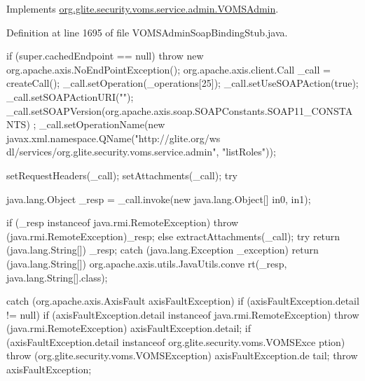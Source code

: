 Implements \hyperlink{interfaceorg_1_1glite_1_1security_1_1voms_1_1service_1_1admin_1_1VOMSAdmin_a546a643a9bbf549ce8e60c2ec03d30c6}{org.glite.security.voms.service.admin.VOMSAdmin}.



Definition at line 1695 of file VOMSAdminSoapBindingStub.java.


\begin{DoxyCode}
                                                                                 
                                                                                {
        if (super.cachedEndpoint == null) {
            throw new org.apache.axis.NoEndPointException();
        }
        org.apache.axis.client.Call _call = createCall();
        _call.setOperation(_operations[25]);
        _call.setUseSOAPAction(true);
        _call.setSOAPActionURI("");
        _call.setSOAPVersion(org.apache.axis.soap.SOAPConstants.SOAP11_CONSTANTS)
      ;
        _call.setOperationName(new javax.xml.namespace.QName("http://glite.org/ws
      dl/services/org.glite.security.voms.service.admin", "listRoles"));

        setRequestHeaders(_call);
        setAttachments(_call);
 try {        java.lang.Object _resp = _call.invoke(new java.lang.Object[] {in0, 
      in1});

        if (_resp instanceof java.rmi.RemoteException) {
            throw (java.rmi.RemoteException)_resp;
        }
        else {
            extractAttachments(_call);
            try {
                return (java.lang.String[]) _resp;
            } catch (java.lang.Exception _exception) {
                return (java.lang.String[]) org.apache.axis.utils.JavaUtils.conve
      rt(_resp, java.lang.String[].class);
            }
        }
  } catch (org.apache.axis.AxisFault axisFaultException) {
    if (axisFaultException.detail != null) {
        if (axisFaultException.detail instanceof java.rmi.RemoteException) {
              throw (java.rmi.RemoteException) axisFaultException.detail;
         }
        if (axisFaultException.detail instanceof org.glite.security.voms.VOMSExce
      ption) {
              throw (org.glite.security.voms.VOMSException) axisFaultException.de
      tail;
         }
   }
  throw axisFaultException;
}
    }
\end{DoxyCode}
